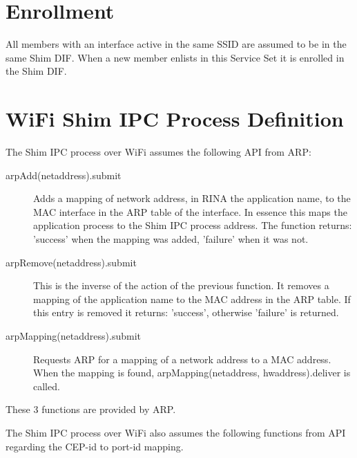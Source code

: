 \section{Enrollment}

All members with an interface active in the same SSID are assumed to be in the same Shim DIF. When a new member enlists in this Service Set it is enrolled in the Shim DIF. 

\section{WiFi Shim IPC Process Definition}
\label{sec:wifi_shim_ipc_proc_def}

The Shim IPC process over WiFi assumes the following API from ARP:

\begin{description}
	\item[arpAdd(netaddress).submit] Adds a mapping of network address, in RINA the application name, to the MAC interface in the ARP table of the interface. In essence this maps the application process to the Shim IPC process address. The function returns: 'success' when the mapping was added, 'failure' when it was not. 
	\item[arpRemove(netaddress).submit] This is the inverse of the action of the previous function. It removes a mapping of the application name to the MAC address in the ARP table. If this entry is removed it returns: 'success', otherwise 'failure' is returned.
	\item[arpMapping(netaddress).submit] Requests ARP for a mapping of a network address to a MAC address. When the mapping is found, arpMapping(netaddress, hwaddress).deliver is called.
\end{description}

These 3 functions are provided by ARP.

\npar

The Shim IPC process over WiFi also assumes the following functions from API regarding the CEP-id to port-id mapping.

